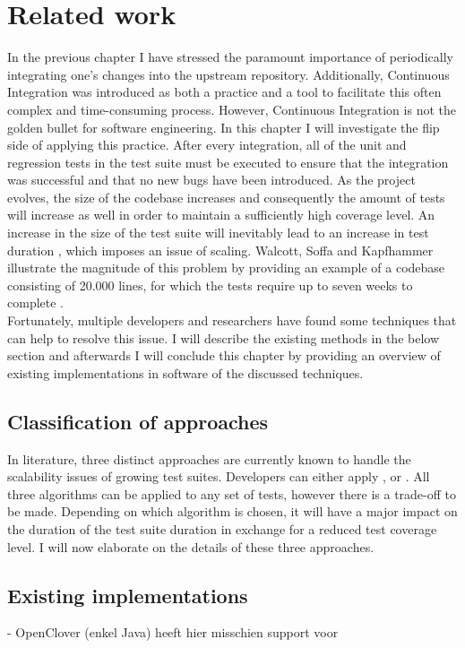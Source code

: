 
\chapter{Related work}
In the previous chapter I have stressed the paramount importance of periodically integrating one's changes into the upstream repository. Additionally, Continuous Integration was introduced as both a practice and a tool to facilitate this often complex and time-consuming process. However, Continuous Integration is not the golden bullet for software engineering. In this chapter I will investigate the flip side of applying this practice. After every integration, all of the unit and regression tests in the test suite must be executed to ensure that the integration was successful and that no new bugs have been introduced. As the project evolves, the size of the codebase increases and consequently the amount of tests will increase as well in order to maintain a sufficiently high coverage level. An increase in the size of the test suite will inevitably lead to an increase in test duration \cite{evaluationoftestsuiteminimization}, which imposes an issue of scaling. Walcott, Soffa and Kapfhammer illustrate the magnitude of this problem by providing an example of a codebase consisting of 20.000 lines, for which the tests require up to seven weeks to complete \cite{10.1145/1146238.1146240}.\\

\noindent Fortunately, multiple developers and researchers have found some techniques that can help to resolve this issue. I will describe the existing methods in the below section and afterwards I will conclude this chapter by providing an overview of existing implementations in software of the discussed techniques.

\section{Classification of approaches}
In literature, three distinct approaches are currently known to handle the scalability issues of growing test suites. Developers can either apply \emph{\tsm{}}, \emph{\tcs{}} or \emph{\tcp{}} \cite{evaluationoftestsuiteminimization}. All three algorithms can be applied to any set of tests, however there is a trade-off to be made. Depending on which algorithm is chosen, it will have a major impact on the duration of the test suite duration in exchange for a reduced test coverage level. I will now elaborate on the details of these three approaches.





\section{Existing implementations}
- OpenClover (enkel Java) heeft hier misschien support voor